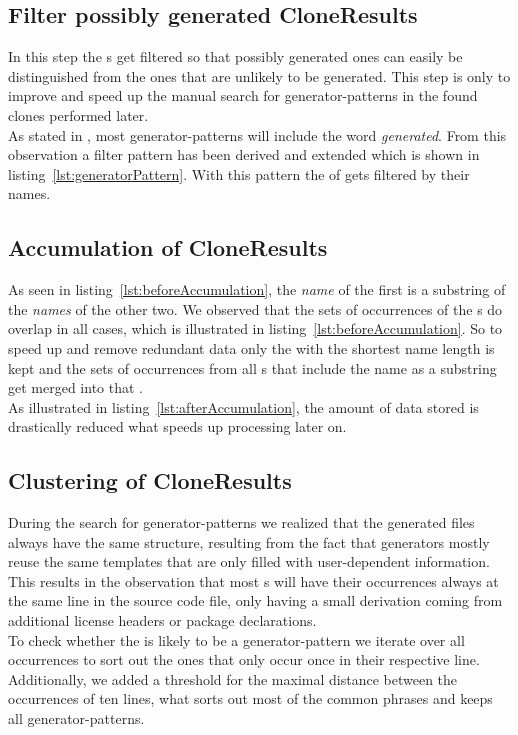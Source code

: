 \subsection{Filter possibly generated CloneResults}
\label{section:filterCloneResults}
In this step the s get filtered so that possibly generated ones can easily be distinguished from the ones that are unlikely to be generated. This step is only to improve and speed up the manual search for generator-patterns in the found clones performed later.\\
As stated in \cite{Bernwieser2014}, most generator-patterns will include the word \textit{generated}. From this observation a filter pattern has been derived and extended which is shown in listing~\ref{lst:generatorPattern}. With this pattern the  of  gets filtered by their names.


\subsection{Accumulation of CloneResults}
\label{section:accumulation}
As seen in listing~\ref{lst:beforeAccumulation}, the \textit{name} of the first  is a substring of the \textit{names} of the other two. We observed that the sets of occurrences of the s do overlap in all cases, which is illustrated in listing~\ref{lst:beforeAccumulation}. So to speed up and remove redundant data only the  with the shortest name length is kept and the sets of occurrences from all s that include the name as a substring get merged into that .\\
As illustrated in listing~\ref{lst:afterAccumulation}, the amount of data stored is drastically reduced what speeds up processing later on.
\cleardoublepage{}



\subsection{Clustering of CloneResults}
\label{section:clustering}
During the search for generator-patterns we realized that the generated files always have the same structure, resulting from the fact that generators mostly reuse the same templates that are only filled with user-dependent information.\\
This results in the observation that most s will have their occurrences always at the same line in the source code file, only having a small derivation coming from additional license headers or package declarations.\\
To check whether the  is likely to be a generator-pattern we iterate over all occurrences to sort out the ones that only occur once in their respective line. Additionally, we added a threshold for the maximal distance between the occurrences of ten lines, what sorts out most of the common phrases and keeps all generator-patterns.

